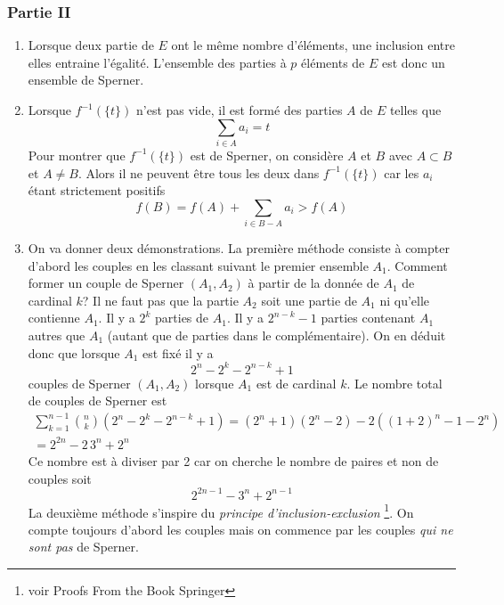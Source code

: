 \subsubsection*{Partie II}
\begin{enumerate}
\item Lorsque deux partie de $E$ ont le m{\^e}me nombre d'{\'e}l{\'e}ments, une inclusion entre elles entraine l'{\'e}galit{\'e}. L'ensemble des parties {\`a} $p$ {\'e}l{\'e}ments de $E$ est donc un ensemble de Sperner.

\item Lorsque $f^{-1}(\{t\})$ n'est pas vide, il est form{\'e} des parties $A$ de $E$ telles que
$$\sum_{i \in A}a_{i}=t$$
Pour montrer que $f^{-1}(\{t\})$ est de Sperner, on consid{\`e}re $A$ et $B$ avec $A \subset B$ et $A \not = B$. Alors il ne peuvent {\^e}tre tous les deux dans $f^{-1}(\{t\})$ car les $a_i$ {\'e}tant strictement positifs
$$f(B)=f(A)+ \sum_{i \in B-A}a_{i}>f(A)$$
\item On va donner deux démonstrations.\newline
La première méthode consiste à compter d'abord les couples en les classant suivant le premier ensemble $A_1$.\newline
Comment former un couple de Sperner $(A_1,A_2)$ {\`a} partir de la donn{\'e}e de $A_1$ de cardinal $k$?\newline
Il ne faut pas que la partie $A_2$ soit une partie de $ A_1$ ni qu'elle contienne $A_1$. Il y a $2^k$ parties de $A_1$. Il y a $2^{n-k}-1$ parties contenant $A_1$ autres que $A_1$ (autant que de parties dans le compl{\'e}mentaire). On en d{\'e}duit donc que lorsque $A_1$ est fix{\'e} il y a
\begin{displaymath}
 2^n-2^k-2^{n-k}+1
\end{displaymath}
couples de Sperner $(A_1,A_2)$ lorsque $A_1$ est de cardinal $k$. Le nombre total de couples  de Sperner est
\begin{multline*}
\sum_{k=1}^{n-1}\binom{n}{k}(2^n-2^k-2^{n-k}+1)
 = (2^n+1)(2^n-2)-2((1+2)^n-1-2^n)\\
 = 2^{2n}-2\,3^n+2^n
\end{multline*}
Ce nombre est {\`a} diviser par 2 car on cherche le nombre de paires et non de couples soit
\begin{displaymath}
2^{2n-1}-3^n+2^{n-1} 
\end{displaymath}
La deuxième méthode s'inspire du \emph{principe d'inclusion-exclusion} \footnote{voir Proofs From the Book Springer}. On compte toujours d'abord les couples mais on commence par les couples \emph{qui ne sont pas} de Sperner.\newline

\end{enumerate}
